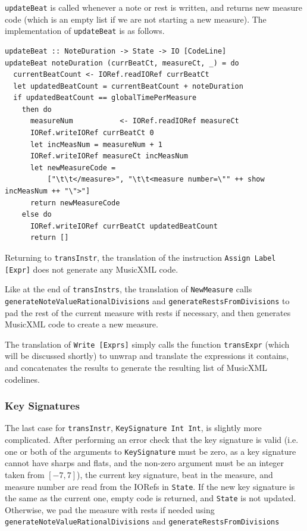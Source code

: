 \documentclass{report}
\begin{document}
\verb.updateBeat. is called whenever a note or rest is written, and returns new measure code (which is an empty list if we are not starting a new measure). The implementation of \verb.updateBeat. is as follows.

\begin{verbatim}
updateBeat :: NoteDuration -> State -> IO [CodeLine]
updateBeat noteDuration (currBeatCt, measureCt, _) = do
  currentBeatCount <- IORef.readIORef currBeatCt
  let updatedBeatCount = currentBeatCount + noteDuration 
  if updatedBeatCount == globalTimePerMeasure 
    then do
      measureNum           <- IORef.readIORef measureCt
      IORef.writeIORef currBeatCt 0   
      let incMeasNum = measureNum + 1
      IORef.writeIORef measureCt incMeasNum 
      let newMeasureCode = 
          ["\t\t</measure>", "\t\t<measure number=\"" ++ show incMeasNum ++ "\">"]
      return newMeasureCode
    else do
      IORef.writeIORef currBeatCt updatedBeatCount
      return []
\end{verbatim}

Returning to \verb.transInstr., the translation of the instruction \verb.Assign Label [Expr]. does not generate any MusicXML code. 

Like at the end of \verb.transInstrs., the translation of \verb.NewMeasure. calls \verb.generateNoteValueRationalDivisions. and \verb.generateRestsFromDivisions. to pad the rest of the current measure with rests if necessary, and then generates MusicXML code to create a new measure. 

The translation of \verb.Write [Exprs]. simply calls the function \verb.transExpr. (which will be discussed shortly) to unwrap and translate the expressions it contains, and concatenates the results to generate the resulting list of MusicXML codelines.

\subsubsection{Key Signatures}

The last case for \verb.transInstr., \verb.KeySignature Int Int., is slightly more complicated. After performing an error check that the key signature is valid (i.e. one or both of the arguments to \verb.KeySignature. must be zero, as a key signature cannot have sharps and flats, and the non-zero argument must be an integer taken from $[-7,7]$), the current key signature, beat in the measure, and measure number are read from the IORefs in \verb.State.. If the new key signature is the same as the current one, empty code is returned, and \verb.State. is not updated. Otherwise, we pad the measure with rests if needed using \verb.generateNoteValueRationalDivisions. and \verb.generateRestsFromDivisions. 
\end{document}
